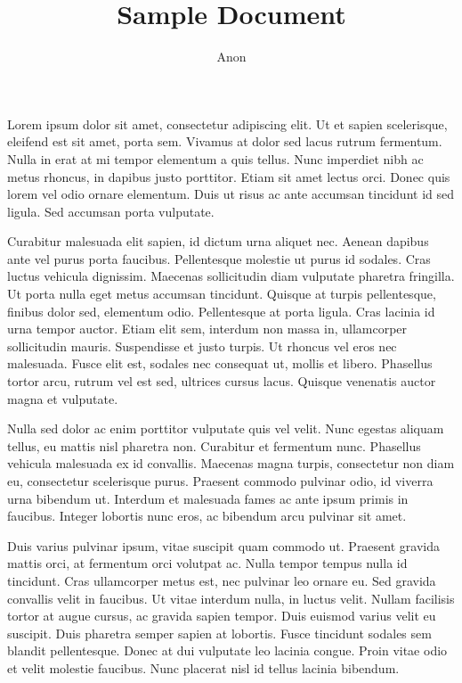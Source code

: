 \documentclass[12pt]{article}
\title{\textbf{Sample Document}}
\author{Anon}
\date{}
\begin{document}
\maketitle

Lorem ipsum dolor sit amet, consectetur adipiscing elit. Ut et sapien scelerisque, eleifend est sit amet, porta sem. Vivamus at dolor sed lacus rutrum fermentum. Nulla in erat at mi tempor elementum a quis tellus. Nunc imperdiet nibh ac metus rhoncus, in dapibus justo porttitor. Etiam sit amet lectus orci. Donec quis lorem vel odio ornare elementum. Duis ut risus ac ante accumsan tincidunt id sed ligula. Sed accumsan porta vulputate.

Curabitur malesuada elit sapien, id dictum urna aliquet nec. Aenean dapibus ante vel purus porta faucibus. Pellentesque molestie ut purus id sodales. Cras luctus vehicula dignissim. Maecenas sollicitudin diam vulputate pharetra fringilla. Ut porta nulla eget metus accumsan tincidunt. Quisque at turpis pellentesque, finibus dolor sed, elementum odio. Pellentesque at porta ligula. Cras lacinia id urna tempor auctor. Etiam elit sem, interdum non massa in, ullamcorper sollicitudin mauris. Suspendisse et justo turpis. Ut rhoncus vel eros nec malesuada. Fusce elit est, sodales nec consequat ut, mollis et libero. Phasellus tortor arcu, rutrum vel est sed, ultrices cursus lacus. Quisque venenatis auctor magna et vulputate.

Nulla sed dolor ac enim porttitor vulputate quis vel velit. Nunc egestas aliquam tellus, eu mattis nisl pharetra non. Curabitur et fermentum nunc. Phasellus vehicula malesuada ex id convallis. Maecenas magna turpis, consectetur non diam eu, consectetur scelerisque purus. Praesent commodo pulvinar odio, id viverra urna bibendum ut. Interdum et malesuada fames ac ante ipsum primis in faucibus. Integer lobortis nunc eros, ac bibendum arcu pulvinar sit amet.

Duis varius pulvinar ipsum, vitae suscipit quam commodo ut. Praesent gravida mattis orci, at fermentum orci volutpat ac. Nulla tempor tempus nulla id tincidunt. Cras ullamcorper metus est, nec pulvinar leo ornare eu. Sed gravida convallis velit in faucibus. Ut vitae interdum nulla, in luctus velit. Nullam facilisis tortor at augue cursus, ac gravida sapien tempor. Duis euismod varius velit eu suscipit. Duis pharetra semper sapien at lobortis. Fusce tincidunt sodales sem blandit pellentesque. Donec at dui vulputate leo lacinia congue. Proin vitae odio et velit molestie faucibus. Nunc placerat nisl id tellus lacinia bibendum.
\end{document}
